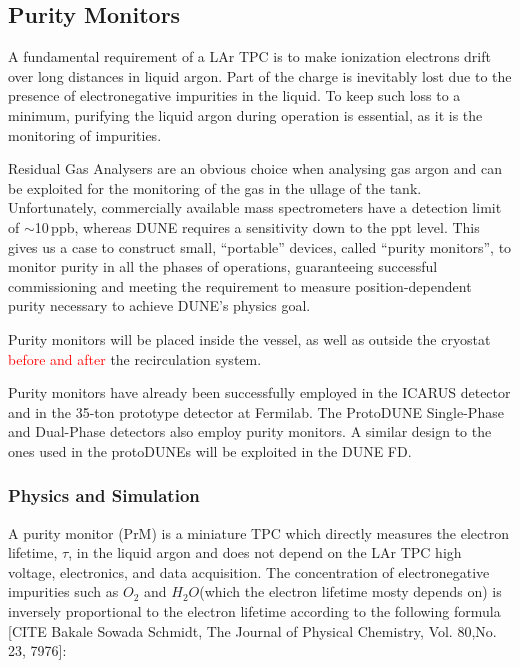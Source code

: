 \subsection{Purity Monitors}
\label{sec:fdsp-slow-cryo-purity-mon}
A fundamental requirement of a LAr TPC is to make ionization electrons drift over long distances in liquid argon. Part of the charge is inevitably lost due to the presence of electronegative impurities in the liquid. To keep such loss to a minimum, purifying the liquid argon during operation is essential, as it is the monitoring of impurities.

Residual Gas Analysers are an obvious choice when analysing gas argon and can be exploited for the monitoring of the gas in the ullage of the tank. Unfortunately, commercially available mass spectrometers have a detection limit of $\sim$10\,ppb, whereas DUNE requires a sensitivity down to the ppt level. This gives us a case to construct small, ``portable'' devices, called ``purity monitors'', to monitor purity in all the phases of operations, guaranteeing successful commissioning and meeting the requirement to measure position-dependent purity necessary to achieve DUNE's physics goal. 

Purity monitors will be placed inside the vessel, as well as outside the cryostat \textcolor{red}{before and after} the recirculation system.

Purity monitors have already been successfully employed in the ICARUS detector and in the 35-ton prototype detector at Fermilab. The ProtoDUNE Single-Phase and Dual-Phase detectors also employ purity monitors. A similar design to the ones used in the protoDUNEs will be exploited in the DUNE FD.

\subsubsection{Physics and Simulation}
A purity monitor (PrM) is a miniature TPC which directly measures the electron lifetime, $\tau$, in the liquid argon and does not depend on the LAr TPC high voltage, electronics, and data acquisition. The concentration of electronegative impurities such as $O_2$ and $H_2O$(which the electron lifetime mosty depends on) is inversely proportional to the electron lifetime according to the following formula [CITE Bakale Sowada Schmidt, The Journal of Physical Chemistry, Vol. 80,No. 23, 7976]:

